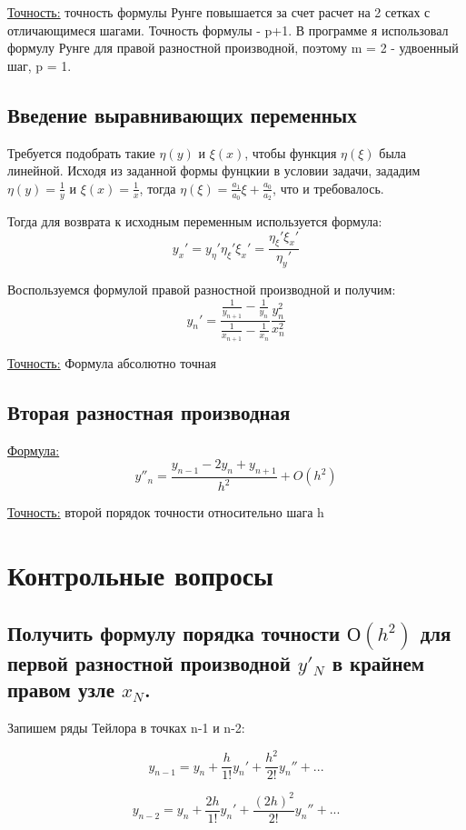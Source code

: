 \documentclass[a4paper,12pt]{article}
\begin{document}
\underline{Точность:} точность формулы Рунге повышается за счет расчет на 2 сетках с отличающимеся шагами. Точность формулы - p+1. В программе я использовал формулу Рунге для правой разностной производной, поэтому m = 2 - удвоенный шаг, p = 1.

\subsection{Введение выравнивающих переменных}
Требуется подобрать такие $\eta(y)$ и $\xi(x)$, чтобы функция $\eta(\xi)$ была линейной. Исходя из заданной формы фунцкии в условии задачи, зададим $\eta(y) = \frac{1}{y}$ и $\xi(x) = \frac{1}{x}$, тогда $\eta(\xi) = \frac{a_1}{a_0}\xi + \frac{a_0}{a_2}$, что и требовалось.

Тогда для возврата к исходным переменным используется формула:
\[y_x' = y_{\eta}'\eta_{\xi}'\xi_{x}' = \frac{\eta_{\xi}'\xi_x'}{\eta_y'}\]

Воспользуемся формулой правой разностной производной и получим:
\[y_n' = \frac{\frac{1}{y_{n+1}} - \frac{1}{y_n}}{\frac{1}{x_{n+1}} - \frac{1}{x_n}}\frac{y_n^2}{x_n^2}\]

\underline{Точность:} Формула абсолютно точная

\subsection{Вторая разностная производная}
\underline{Формула:}
\[y''_n = \frac{y_{n-1} - 2y_n + y_{n+1}}{h^2} + O(h^2)\]

\underline{Точность:} второй порядок точности относительно шага h

\section{Контрольные вопросы}
\subsection{Получить формулу порядка точности $О(h^2)$ для первой разностной производной $y'_N$ в крайнем правом узле $x_N$.}
Запишем ряды Тейлора в точках n-1 и n-2:

\begin{equation}
    y_{n-1} = y_{n} + \frac{h}{1!}y_n' + \frac{h^2}{2!}y_n'' + ...
\end{equation}

\begin{equation}
    y_{n-2} = y_{n} + \frac{2h}{1!}y_n' + \frac{(2h)^2}{2!}y_n'' + ...
\end{equation}
\end{document}
